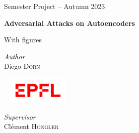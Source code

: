 \begin{titlepage}
\begin{center}
    \Large
    \textsf{Semester Project -- Autumn 2023}

    \vspace{1em}

    \textbf{\textsf{
        \Huge
        Adversarial Attacks on Autoencoders
    }}

    \begin{center}
        With  figures
    \end{center}


    \vfill

    \begin{center}
        \normalsize
        \scalebox{0.8}{
        }
    \end{center}

    \vfill


    \begin{minipage}{0.3\textwidth}
        \textit{Author} \\
        Diego \textsc{Dorn}
    \end{minipage}
    ~
    \includegraphics[width=3cm]{epfl.png}
    ~
    \begin{minipage}{0.3\textwidth}
        \begin{flushright}
            \textit{Supervisor} \\
            Clément \textsc{Hongler}
        \end{flushright}
    \end{minipage}
    \vspace{1cm}

    \vspace*{-3cm}
\end{center}
\end{titlepage}